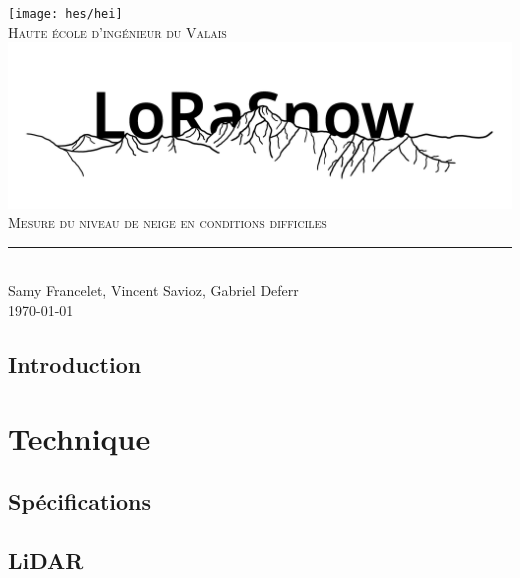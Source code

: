 \documentclass[11pt,titlepage]{report}
\begin{document}
\begin{titlepage}
	\centering
    \texttt{[image: hes/hei]}\\[1cm] 	%
    \textsc{\LARGE Haute école d'ingénieur du Valais}\\ \vspace{\fill}
    \includegraphics[width=1\linewidth]{Images/Logo_LoRaSnow.png}\\ \vspace{\fill}
	\textsc{\LARGE Mesure du niveau de neige en conditions difficiles}\\[0.4cm]
	\rule{\linewidth}{0.2 mm} \\[0.5 cm]
	Samy Francelet, Vincent Savioz, Gabriel Deferr \\
	\today
\end{titlepage}
\restoregeometry

\tableofcontents
\listoffigures
\listoftables
\pagestyle{fancy}

\chapter{Introduction}


\part{Technique}

\chapter{Spécifications}


\chapter{LiDAR}


\end{document}
